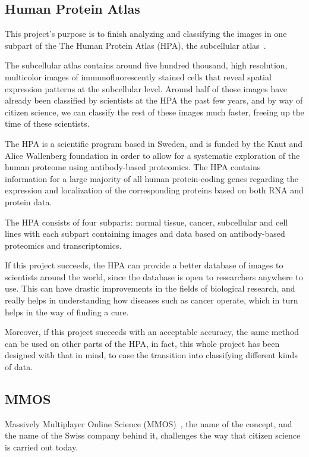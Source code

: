 \subsection{Human Protein Atlas}

This project's purpose is to finish analyzing and classifying the images in one subpart of the The Human Protein Atlas (HPA), the subcellular atlas~\cite{subcellatlas}.

The subcellular atlas contains around five hundred thousand, high resolution, multicolor images of immunofluorescently stained cells that reveal spatial expression patterns at the subcellular level. Around half of those images have already been classified by scientists at the HPA the past few years, and by way of citizen science, we can classify the rest of these images much faster, freeing up the time of these scientists.

The HPA is a scientific program based in Sweden, and is funded by the Knut and Alice Wallenberg foundation in order to allow for a systematic exploration of the human proteome using antibody-based proteomics. The HPA contains information for a large majority of all human protein-coding genes regarding the expression and localization of the corresponding proteins based on both RNA and protein data.

The HPA consists of four subparts: normal tissue, cancer, subcellular and cell lines with each subpart containing images and data based on antibody-based proteomics and transcriptomics.

If this project succeeds, the HPA can provide a better database of images to scientists around the world, since the database is open to researchers anywhere to use. This can have drastic improvements in the fields of biological research, and really helps in understanding how diseases such as cancer operate, which in turn helps in the way of finding a cure. 

Moreover, if this project succeeds with an acceptable accuracy, the same method can be used on other parts of the HPA, in fact, this whole project has been designed with that in mind, to ease the transition into classifying different kinds of data.

\subsection{MMOS}

Massively Multiplayer Online Science (MMOS)~\cite{mmos}, the name of the concept, and the name of the Swiss company behind it, challenges the way that citizen science is carried out today. 

